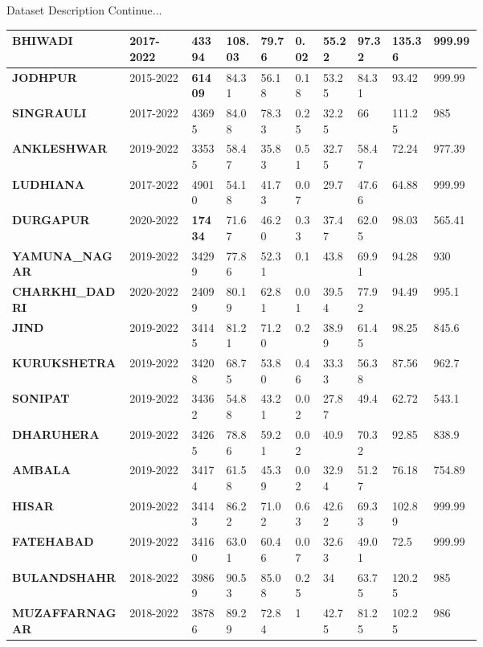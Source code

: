 \documentclass[12pt, aspectratio=169]{beamer}
\begin{document}
\begin{frame}{Dataset Description  \tiny{Continue...}}
\begin{table}
\begin{tabular}{|p{0.17\linewidth}|p{0.09\linewidth}|p{0.05\linewidth}|p{0.05\linewidth}|p{0.05\linewidth}|p{0.04\linewidth}|p{0.05\linewidth}|p{0.05\linewidth}|p{0.06\linewidth}|p{0.07\linewidth}|}
		\textbf{BHIWADI}          & 2017-2022  & 43394   & 108.03 & 79.76  & 0.02 & 55.22   & 97.32       & 135.36 & 999.99 \\ \hline
		\textbf{JODHPUR}     & 2015-2022 &\textbf{61409} & 84.31 & 56.18 & 0.18 & 53.25   & 84.31 & 93.42   & 999.99 \\ \hline
		\textbf{SINGRAULI}    & 2017-2022 & 43695   & 84.08 & 78.33 & 0.25 & 32.25   & 66          & 111.25  & 985    \\ \hline
		\textbf{ANKLESHWAR}   & 2019-2022  & 33535     & 58.47 & 35.83 & 0.51 & 32.75   & 58.47 & 72.24   & 977.39 \\ \hline 
		\textbf{LUDHIANA}        & 2017-2022  & 49010  & 54.18 & 41.73 & 0.07 & 29.7    & 47.66       & 64.88   & 999.99 \\ \hline
		\textbf{DURGAPUR}       & 2020-2022 & \textbf{17434}   & 71.67 & 46.20 & 0.33 & 37.47 & 62.05      & 98.03 & 565.41 \\ \hline 
		\textbf{YAMUNA\_NAGAR}  & 2019-2022 & 34299   & 77.86  & 52.31 & 0.1  & 43.8    & 69.91       & 94.28   & 930    \\ \hline
		\textbf{CHARKHI\_DADRI}  & 2020-2022  & 24099   & 80.19 & 62.81 & 0.01 & 39.54  & 77.92       & 94.49  & 995.1  \\ \hline 
		\textbf{JIND  }           & 2019-2022 & 34145 & 81.21 & 71.20 & 0.2  & 38.99   & 61.45       & 98.25   & 845.6  \\ \hline 
		\textbf{KURUKSHETRA}    & 2019-2022  & 34208 & 68.75& 53.80 & 0.46 & 33.33   & 56.38       & 87.56   & 962.7  \\ \hline 
		\textbf{SONIPAT}        & 2019-2022  & 34362  & 54.88 & 43.21  & 0.02 & 27.87   & 49.4        & 62.72   & 543.1  \\ \hline 
		\textbf{DHARUHERA}     & 2019-2022 & 34265 & 78.86 & 59.21 & 0.02 & 40.9    & 70.32       & 92.85   & 838.9  \\ \hline
		\textbf{AMBALA}         & 2019-2022 & 34174 & 61.58 & 45.39 & 0.02 & 32.94   & 51.27       & 76.18 & 754.89 \\ \hline
		\textbf{HISAR}          & 2019-2022 & 34143 & 86.22 & 71.02 & 0.63 & 42.62   & 69.33       & 102.89 & 999.99 \\ \hline 
		\textbf{FATEHABAD}      & 2019-2022 & 34160 & 63.01 & 60.46 & 0.07 & 32.63   & 49.01       & 72.5    & 999.99 \\ \hline
		\textbf{BULANDSHAHR}  & 2018-2022 & 39869  & 90.53 & 85.08 & 0.25 & 34      & 63.75       & 120.25  & 985    \\ \hline 
		\textbf{MUZAFFARNAGAR}  & 2018-2022 & 38786 & 89.29 & 72.84  & 1    & 42.75   & 81.25       & 102.25  & 986    \\ \hline
		\end{tabular}
	\end{table}
\end{frame}
\end{document}
